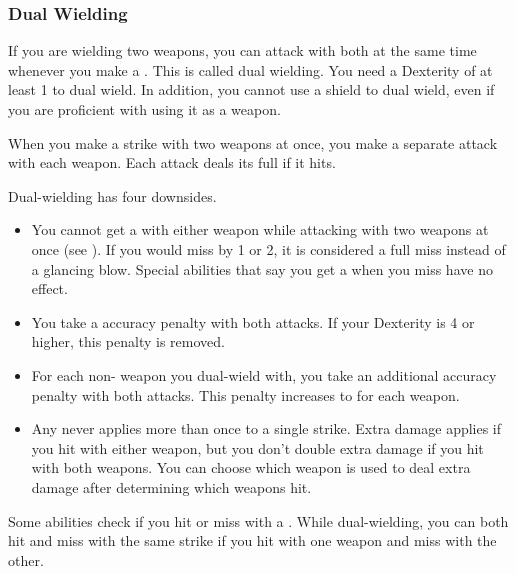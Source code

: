         \subsubsection{Dual Wielding}\label{Dual Wielding}
            If you are wielding two weapons, you can attack with both at the same time whenever you make a .
            This is called dual wielding.
            You need a Dexterity of at least 1 to dual wield.
            In addition, you cannot use a shield to dual wield, even if you are proficient with using it as a weapon.

            When you make a strike with two weapons at once, you make a separate attack with each weapon.
            Each attack deals its full  if it hits.

            Dual-wielding has four downsides.
            \begin{itemize}
                \item You cannot get a  with either weapon while attacking with two weapons at once (see ).
                    If you would miss by 1 or 2, it is considered a full miss instead of a glancing blow.
                    Special abilities that say you get a  when you miss have no effect.
                \item You take a  accuracy penalty with both attacks.
                    If your Dexterity is 4 or higher, this penalty is removed.
                \item For each non- weapon you dual-wield with, you take an additional  accuracy penalty with both attacks.
                    This penalty increases to  for each  weapon.
                \item Any  never applies more than once to a single strike.
                    Extra damage applies if you hit with either weapon, but you don't double extra damage if you hit with both weapons.
                    You can choose which weapon is used to deal extra damage after determining which weapons hit.
            \end{itemize}

            Some abilities check if you hit or miss with a .
            While dual-wielding, you can both hit and miss with the same strike if you hit with one weapon and miss with the other.

